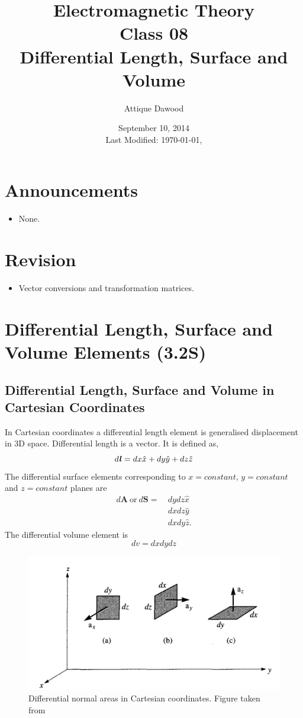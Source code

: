 \documentclass[12pt,a4paper]{article}
\title{Electromagnetic Theory\\Class 08\\Differential Length, Surface and Volume}
\author{Attique Dawood}
\date{September 10, 2014\\[0.2cm] Last Modified: \today, \currenttime}
\begin{document}
\maketitle
\section{Announcements}
\begin{itemize}
\item None.
\end{itemize}
\section{Revision}
\begin{itemize}
\item Vector conversions and transformation matrices.
\end{itemize}
\section{Differential Length, Surface and Volume Elements (3.2S)}
\subsection{Differential Length, Surface and Volume in Cartesian Coordinates}
In Cartesian coordinates a differential length element is generalised displacement in 3D space. Differential length is a vector. It is defined as,
\begin{equation}
d\textbf{\textit{l}}=dx\hat x+dy\hat y+dz\hat z
\end{equation}
The differential surface elements corresponding to $x=constant$, $y=constant$ and $z=constant$ planes are
\begin{equation}
\begin{split}
d\textbf{A}~\mathrm{or}~d\textbf{S}=~&dydz\hat x\\
&dxdz\hat y\\
&dxdy\hat z.
\end{split}
\end{equation}
The differential volume element is
\begin{equation}
dv=dxdydz
\end{equation}
\begin{figure}[H]
\centering
\includegraphics[scale=0.3]{Figure3-2S.png}
\caption{Differential normal areas in Cartesian coordinates. Figure taken from~\cite[Figure 3.2, page 54]{Sadiku}}
\label{Cartesian-differential-area}
\end{figure}
\end{document}
